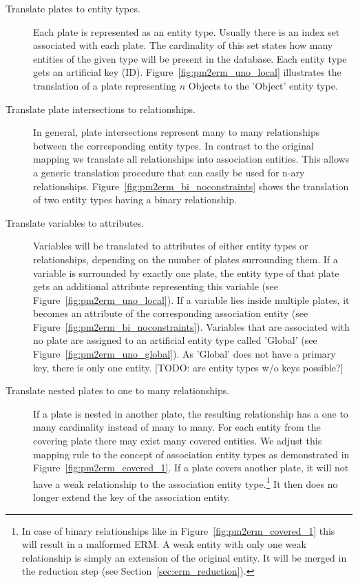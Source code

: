 \begin{description}
\item[Translate plates to entity types.] Each plate is represented as an entity type. Usually there is an index set associated with each plate. The cardinality of this set states how many entities of the given type will be present in the database. Each entity type gets an artificial key (ID). Figure~\ref{fig:pm2erm_uno_local} illustrates the translation of a plate representing $n$ Objects to the 'Object' entity type.

\item[Translate plate intersections to relationships.] In general, plate intersections represent many to many relationships between the corresponding entity types. In contrast to the original mapping we translate all relationships into association entities. This allows a generic translation procedure that can easily be used for n-ary relationships. Figure~\ref{fig:pm2erm_bi_noconstraints} shows the translation of two entity types having a binary relationship.

\item[Translate variables to attributes.] Variables will be translated to attributes of either entity types or relationships, depending on the number of plates surrounding them. If a variable is surrounded by exactly one plate, the entity type of that plate gets an additional attribute representing this variable (see Figure~\ref{fig:pm2erm_uno_local}). If a variable lies inside multiple plates, it becomes an attribute of the corresponding association entity (see Figure~\ref{fig:pm2erm_bi_noconstraints}). Variables that are associated with no plate are assigned to an artificial entity type called 'Global' (see Figure~\ref{fig:pm2erm_uno_global}). As 'Global' does not have a primary key, there is only one entity. [TODO: are entity types w/o keys possible?]

\item[Translate nested plates to one to many relationships.] If a plate is nested in another plate, the resulting relationship has a one to many cardinality instead of many to many. For each entity from the covering plate there may exist many covered entities. We adjust this mapping rule to the concept of association entity types as demonstrated in Figure~\ref{fig:pm2erm_covered_1}. If a plate covers another plate, it will not have a weak relationship to the association entity type.\footnote{In case of binary relationships like in Figure~\ref{fig:pm2erm_covered_1} this will result in a malformed ERM. A weak entity with only one weak relationship is simply an extension of the original entity. It will be merged in the reduction step (see Section~\ref{sec:erm_reduction}).} It then does no longer extend the key of the association entity.
\end{description}

